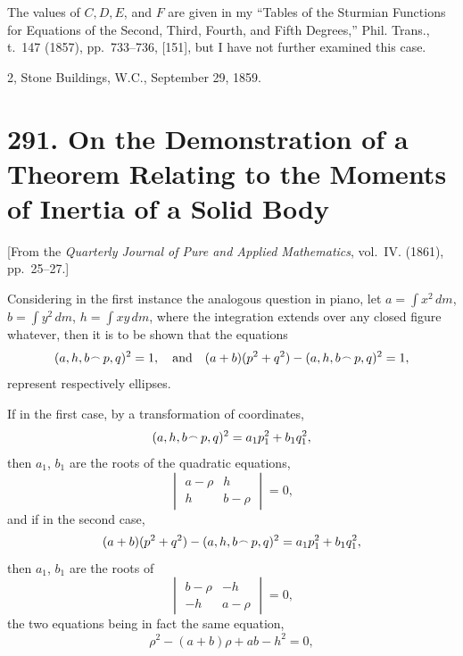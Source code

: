 \documentclass[11pt,a4paper]{article}
\theoremstyle{plain}
\begin{document}
The values of $C, D, E$, and $F$ are given in my ``Tables of the Sturmian Functions for Equations of the Second, Third, Fourth, and Fifth Degrees,'' Phil. Trans., t.~147 (1857), pp.~733--736, [151], but I have not further examined this case.

\hfill 2, Stone Buildings, W.C., September 29, 1859.


\newpage
\section*{291. On the Demonstration of a Theorem Relating to the Moments of Inertia of a Solid Body}
\label{sec:291}

[From the \textit{Quarterly Journal of Pure and Applied Mathematics}, vol.~IV. (1861), pp.~25--27.]

Considering in the first instance the analogous question in piano, let $a = \int x^2\,dm$, $b = \int y^2\,dm$, $h = \int xy\,dm$, where the integration extends over any closed figure whatever, then it is to be shown that the equations
\[
(a, h, b \mathbin{\vcenter{\hbox{$\scriptstyle\!\frown$}}} p, q)^2 = 1,\quad \text{and}\quad (a + b)(p^2 + q^2) - (a, h, b \mathbin{\vcenter{\hbox{$\scriptstyle\!\frown$}}} p, q)^2 = 1,
\]
represent respectively ellipses.

If in the first case, by a transformation of coordinates,
\[
(a, h, b \mathbin{\vcenter{\hbox{$\scriptstyle\!\frown$}}} p, q)^2 = a_1p_1^2 + b_1q_1^2,
\]
then $a_1$, $b_1$ are the roots of the quadratic equations,
\[
\begin{vmatrix}
a - \rho & h \\
h & b - \rho
\end{vmatrix} = 0,
\]
and if in the second case,
\[
(a + b)(p^2 + q^2) - (a, h, b \mathbin{\vcenter{\hbox{$\scriptstyle\!\frown$}}} p, q)^2 = a_1p_1^2 + b_1q_1^2,
\]
then $a_1$, $b_1$ are the roots of
\[
\begin{vmatrix}
b - \rho & -h \\
-h & a - \rho
\end{vmatrix} = 0,
\]
the two equations being in fact the same equation,
\[
\rho^2 - (a + b)\rho + ab - h^2 = 0,
\]
\end{document}
